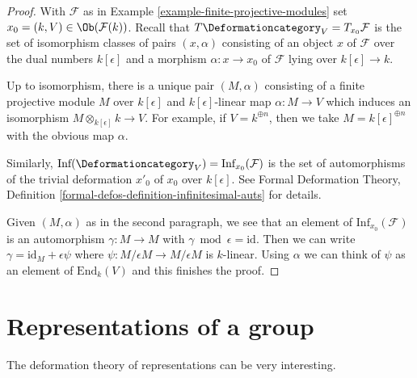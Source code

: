 \begin{proof}
With $\mathcal{F}$ as in Example \ref{example-finite-projective-modules}
set $x_0 = (k, V) \in \Ob(\mathcal{F}(k))$.
Recall that $T\Deformationcategory_V = T_{x_0}\mathcal{F}$
is the set of isomorphism
classes of pairs $(x, \alpha)$ consisting of an object $x$ of $\mathcal{F}
$ over the dual numbers $k[\epsilon]$ and a morphism
$\alpha : x \to x_0$ of $\mathcal{F}$ lying over $k[\epsilon] \to k$.

\medskip\noindent
Up to isomorphism, there is a unique pair $(M, \alpha)$ consisting of a
finite projective module $M$ over $k[\epsilon]$
and $k[\epsilon]$-linear map $\alpha : M \to V$
which induces an isomorphism $M \otimes_{k[\epsilon]} k \to V$.
For example, if $V = k^{\oplus n}$, then we take
$M = k[\epsilon]^{\oplus n}$ with the obvious map $\alpha$.

\medskip\noindent
Similarly, $\text{Inf}(\Deformationcategory_V) = \text{Inf}_{x_0}(\mathcal{F})$
is the set of automorphisms
of the trivial deformation $x'_0$ of $x_0$ over $k[\epsilon]$.
See Formal Deformation Theory, Definition
\ref{formal-defos-definition-infinitesimal-auts} for details.

\medskip\noindent
Given $(M, \alpha)$ as in the second paragraph, we see that an element of
$\text{Inf}_{x_0}(\mathcal{F})$ is an automorphism $\gamma : M \to M$ with
$\gamma \bmod \epsilon = \text{id}$. Then we can write
$\gamma = \text{id}_M + \epsilon \psi$ where
$\psi : M/\epsilon M \to M/\epsilon M$ is $k$-linear.
Using $\alpha$ we can think of $\psi$ as an element of
$\text{End}_k(V)$ and this finishes the proof.
\end{proof}




\section{Representations of a group}
\label{section-representations}

\noindent
The deformation theory of representations can be very interesting.

